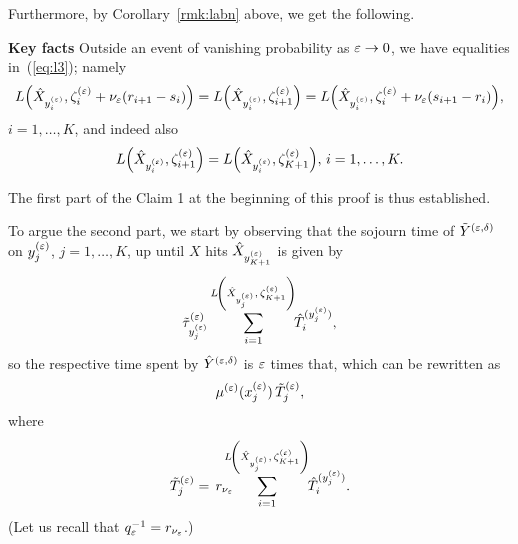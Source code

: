 Furthermore, by Corollary~\ref{rmk:labn} above, we get the following.


{\noindent \bf Key facts} Outside an event of vanishing probability as $\varepsilon\to0$, we have equalities
in~(\ref{eq:l3}); namely
\begin{equation}\label{eq:kf}%
L\!\left(\txt_{\yep_i},\ze_{i}+\nu_\eps(r_{i+1}-s_i)\right)
= L\!\left(\txt_{\yep_i},\ze_{i+1}\right)%
= L\!\left(\txt_{\yep_i},\ze_{i}+\nu_\eps(s_{i+1}-r_i)\right)\!,
\end{equation}
$i=1,\ldots,K$, and indeed also
\begin{equation}\label{eq:kf1}%
L\!\left(\txt_{\yep_i},\ze_{i+1}\right)%
=L\!\left(\txt_{\yep_i},\ze_{K+1}\right)\!,\, i=1,\ldots,K.
\end{equation}

The first part of the Claim 1 at the beginning of this proof is thus established.
















To argue the second part, we start by observing that
the sojourn time of $\tilde Y^{(\varepsilon,\delta)}$ on $y^{(\varepsilon)}_j$, $j=1,\ldots,K$, up until $X$ hits 
$\hat X_{y^{(\varepsilon)}_{K+1}}$ is given by 
\begin{equation}
\label{bte}
\tilde\tau^{(\eps)}_{\yep_j}\sum_{i=1}^{L\!\left(\txt_{\yep_j},\,\ze_{K+1}\right)}\!\!\hat T^{(\yep_j)}_{i},
\end{equation}
so the respective time spent by $\hat Y^{(\varepsilon,\delta)}$ is $\varepsilon$ times that, which can be rewritten as
\begin{equation}
\label{bte1}
\mue(\xe_j)\,\tilde T^{(\eps)}_j,
\end{equation}
where
\begin{equation}
\label{bte2}
\tilde T^{(\eps)}_j=\,r_{\nu_\eps}\!\!\!\!\!\sum_{i=1}^{L\!\left(\txt_{\yep_j},\,\ze_{K+1}\right)}\!\!\hat T^{(\yep_j)}_{i}.
\end{equation}
(Let us recall that $q_\varepsilon^{-1}=r_{\nu_\varepsilon}$.)













